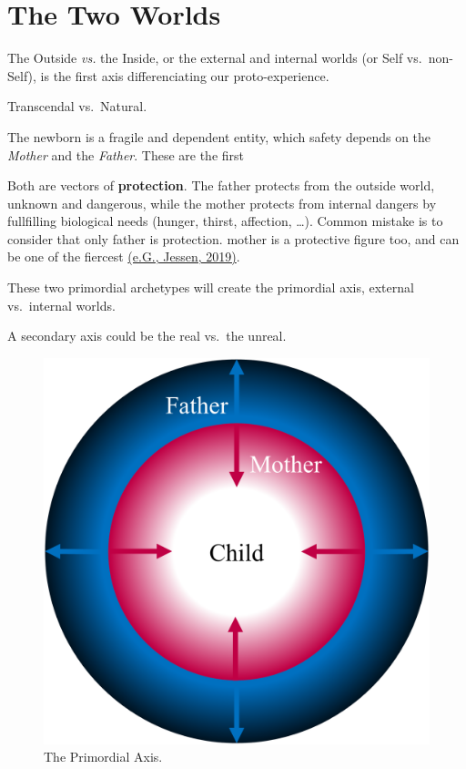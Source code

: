 \documentclass[
]{book}
\begin{document}
\hypertarget{the-two-worlds}{%
\section{The Two Worlds}\label{the-two-worlds}}

The Outside \emph{vs.} the Inside, or the external and internal worlds (or Self vs.~non-Self), is the first axis differenciating our proto-experience.

Transcendal vs.~Natural.

The newborn is a fragile and dependent entity, which safety depends on the \emph{Mother} and the \emph{Father}. These are the first

Both are vectors of \textbf{protection}. The father protects from the outside world, unknown and dangerous, while the mother protects from internal dangers by fullfilling biological needs (hunger, thirst, affection, \ldots). Common mistake is to consider that only father is protection. mother is a protective figure too, and can be one of the fiercest \href{https://doi.org/10.1101/827626}{(e.G., Jessen, 2019)}.

These two primordial archetypes will create the primordial axis, external vs.~internal worlds.

A secondary axis could be the real vs.~the unreal.

\begin{figure}

{\centering \includegraphics[width=\textwidth]{img/protection} 

}

\caption{The Primordial Axis.}\label{fig:unnamed-chunk-15}
\end{figure}
\end{document}
